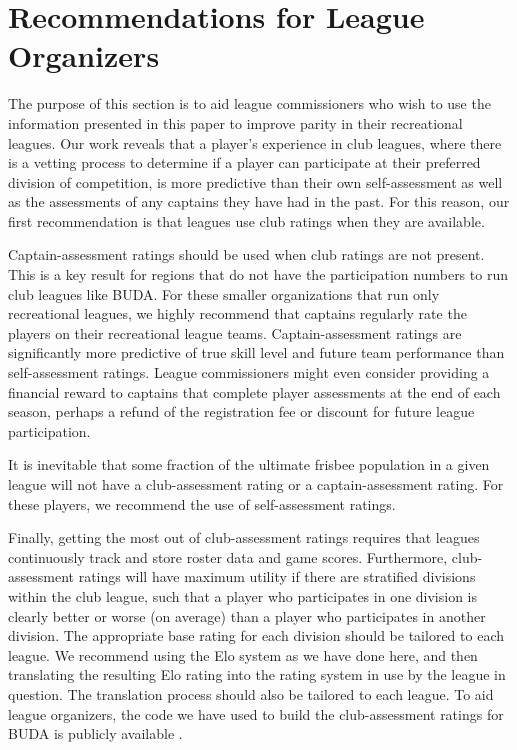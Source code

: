 \section{Recommendations for League Organizers}\label{sec:recommendations}

The purpose of this section is to aid league commissioners who wish to use the information presented in this paper to improve parity in their recreational leagues. Our work reveals that a player's experience in club leagues, where there is a vetting process to determine if a player can participate at their preferred division of competition, is more predictive than their own self-assessment as well as the assessments of any captains they have had in the past. For this reason, our first recommendation is that leagues use club ratings when they are available. 

Captain-assessment ratings should be used when club ratings are not present. This is a key result for regions that do not have the participation numbers to run club leagues like BUDA. For these smaller organizations that run only recreational leagues, we highly recommend that captains regularly rate the players on their recreational league teams. Captain-assessment ratings are significantly more predictive of true skill level and future team performance than self-assessment ratings. League commissioners might even consider providing a financial reward to captains that complete player assessments at the end of each season, perhaps a refund of the registration fee or discount for future league participation. 

It is inevitable that some fraction of the ultimate frisbee population in a given league will not have a club-assessment rating or a captain-assessment rating. For these players, we recommend the use of self-assessment ratings.

Finally, getting the most out of club-assessment ratings requires that leagues continuously track and store roster data and game scores. Furthermore, club-assessment ratings will have maximum utility if there are stratified divisions within the club league, such that a player who participates in one division is clearly better or worse (on average) than a player who participates in another division. The appropriate base rating for each division should be tailored to each league. We recommend using the Elo system as we have done here, and then translating the resulting Elo rating into the rating system in use by the league in question. The translation process should also be tailored to each league. To aid league organizers, the code we have used to build the club-assessment ratings for BUDA is publicly available \cite{shanegit}.